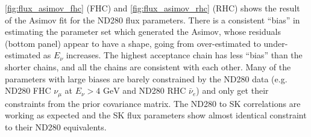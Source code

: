 \autoref{fig:flux_asimov_fhc} (FHC) and \autoref{fig:flux_asimov_rhc} (RHC) shows the result of the Asimov fit for the ND280 flux parameters. There is a consistent ``bias'' in estimating the parameter set which generated the Asimov, whose residuals (bottom panel) appear to have a shape, going from over-estimated to under-estimated as $E_\nu$ increases. The highest acceptance chain has less ``bias'' than the shorter chains, and all the chains are consistent with each other. Many of the parameters with large biases are barely constrained by the ND280 data (e.g. ND280 FHC $\nu_\mu$ at $E_\nu > 4\text{ GeV}$ and ND280 RHC $\bar{\nu}_e$) and only get their constraints from the prior covariance matrix. The ND280 to SK correlations are working as expected and the SK flux parameters show almost identical constraint to their ND280 equivalents.

